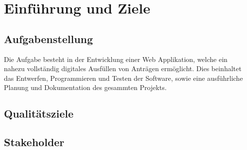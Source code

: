 \chapter{Einführung und Ziele}\label{ch:einfuhrung-und-ziele}

\section{Aufgabenstellung}\label{sec:aufgabenstellung}
Die Aufgabe besteht in der Entwicklung einer Web Applikation, welche ein nahezu vollständig digitales
Ausfüllen von Anträgen ermöglicht. Dies beinhaltet das Entwerfen, Programmieren und Testen der 
Software, sowie eine ausführliche Planung und Dokumentation des gesammten Projekts.
\section{Qualitätsziele}\label{sec:qualitatsziele}

\section{Stakeholder}\label{sec:stakeholder}
